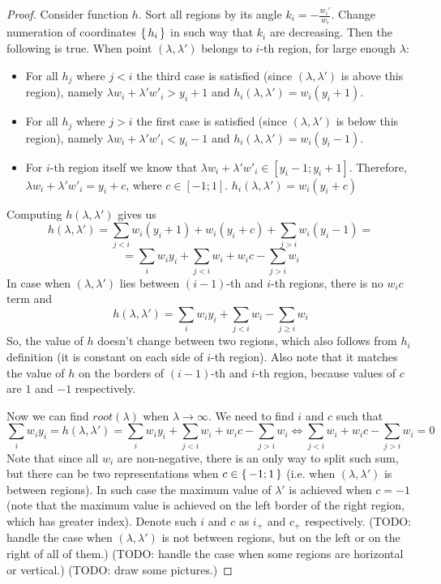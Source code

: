 \begin{proof}
	Consider function $h$. Sort all regions by its angle $k_i = - \frac {w_i'} {w_i}$.
	Change numeration of coordinates $\set{h_i}$ in such way that $k_i$ are decreasing.
	Then the following is true. When point $(\lambda, \lambda')$ belongs to $i$-th region, for large enough $\lambda$:
	\begin{itemize}
		\item For all $h_j$ where $j < i$ the third case is satisfied (since $(\lambda, \lambda')$ is above this region), namely $\lambda w_i + \lambda' w'_i > y_i + 1$ and $h_i(\lambda, \lambda') = w_i (y_i + 1)$.
		\item For all $h_j$ where $j > i$ the first case is satisfied (since $(\lambda, \lambda')$ is below this region), namely $\lambda w_i + \lambda' w'_i < y_i - 1$ and $h_i(\lambda, \lambda') = w_i (y_i - 1)$.
		\item For $i$-th region itself we know that $\lambda w_i + \lambda' w'_i \in [y_i - 1; y_i + 1]$. Therefore, $\lambda w_i + \lambda' w'_i = y_i + c$, where $c \in [-1; 1]$.
		$h_i(\lambda, \lambda') = w_i (y_i + c)$
	\end{itemize}
	Computing $h(\lambda, \lambda')$ gives us
	\[h(\lambda, \lambda') = \sum\limits_{j < i} w_i (y_i + 1) + w_i (y_i + c) + \sum\limits_{j > i} w_i (y_i - 1) =\]
	\[= \sum\limits_i w_i y_i + \sum\limits_{j < i} w_i + w_i c - \sum\limits_{j > i} w_i\]
	In case when $(\lambda, \lambda')$ lies between $(i-1)$-th and $i$-th regions, there is no $w_i c$ term and 
	\[h(\lambda, \lambda') = \sum\limits_i w_i y_i + \sum\limits_{j < i} w_i - \sum\limits_{j \ge i} w_i\]
	So, the value of $h$ doesn't change between two regions, which also follows from $h_i$ definition (it is constant on each side of $i$-th region). Also note that it matches the value of $h$ on the borders of $(i-1)$-th and $i$-th region, because values of $c$ are $1$ and $-1$ respectively.
	
	Now we can find $root(\lambda)$ when $\lambda \to \infty$. We need to find $i$ and $c$ such that
	\[\sum\limits_i w_i y_i = h(\lambda, \lambda') = \sum\limits_i w_i y_i + \sum\limits_{j < i} w_i + w_i c - \sum\limits_{j > i} w_i \iff \sum\limits_{j < i} w_i + w_i c - \sum\limits_{j > i} w_i = 0\]
	Note that since all $w_i$ are non-negative, there is an only way to split such sum, but there can be two representations when $c \in \set{-1; 1}$ (i.e. when $(\lambda, \lambda')$ is between regions).
	In such case the maximum value of $\lambda'$ is achieved when $c = -1$ (note that the maximum value is achieved on the left border of the right region, which has greater index).
	Denote such $i$ and $c$ as $i_+$ and $c_+$ respectively.
	(TODO: handle the case when $(\lambda, \lambda')$ is not between regions, but on the left or on the right of all of them.)
	(TODO: handle the case when some regions are horizontal or vertical.)
	(TODO: draw some pictures.)
	

\end{proof}
